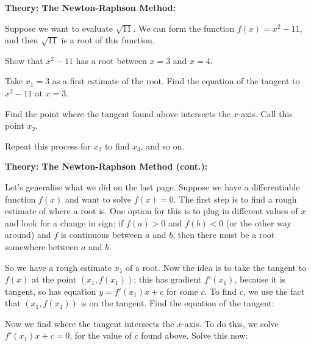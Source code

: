 \documentclass{article}
\begin{document}
\textbf{Theory: The Newton-Raphson Method:}

\vspace{5mm}

Suppose we want to evaluate $\sqrt{11}$. We can form the function $f(x)=x^2-11$, and then $\sqrt{11}$ is a root of this function.\bigskip


Show that $x^2-11$ has a root between $x=3$ and $x=4$.

\vfill



Take $x_1=3$ as a first estimate of the root. Find the equation of the tangent to $x^2-11$ at $x=3$.

\vfill

Find the point where the tangent found above intersects the $x$-axis. Call this point $x_2$.

\vfill


Repeat this process for $x_2$ to find $x_3$, and so on.





\clearpage






\textbf{Theory: The Newton-Raphson Method (cont.):}

\vspace{5mm}

Let's generalise what we did on the last page. Suppose we have a differentiable function $f(x)$ and want to solve $f(x)=0$. The first step is to find a rough estimate of where a root is. One option for this is to plug in different values of $x$ and look for a change in sign; if $f(a)>0$ and $f(b)<0$ (or the other way around) and $f$ is continuous between $a$ and $b$, then there must be a root somewhere between $a$ and $b$.

So we have a rough estimate $x_1$ of a root. Now the idea is to take the tangent to $f(x)$ at the point $(x_1,f(x_1))$; this has gradient $f'(x_1)$, because it is tangent, so has equation $y=f'(x_1)x+c$ for some $c$. To find $c$, we use the fact that $(x_1,f(x_1))$ is on the tangent. Find the equation of the tangent:


\vfill

Now we find where the tangent intersects the $x$-axis. To do this, we solve $f'(x_1)x+c=0$, for the value of $c$ found above. Solve this now:

\end{document}

